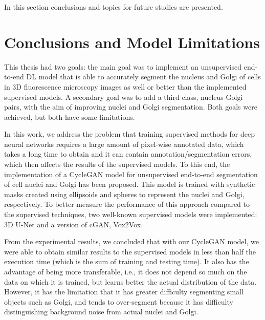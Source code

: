 \cleardoublepage
\label{chap:conclusion}

In this section conclusions and topics for future studies are presented.
\section{Conclusions and Model Limitations}

This thesis had two goals: the main goal was to implement an unsupervised end-to-end \ac{DL} model that is able to accurately segment the nucleus and Golgi of cells in \ac{3D} fluorescence microscopy images as well or better than the implemented supervised models. A secondary goal was to add a third class, nucleus-Golgi pairs, with the aim of improving nuclei and Golgi segmentation. Both goals were achieved, but both have some limitations.

In this work, we address the problem that training supervised methods for deep neural networks requires a large amount of pixel-wise annotated data, which takes a long time to obtain and it can contain annotation/segmentation errors, which then affects the results of the supervised models. To this end, the implementation of a CycleGAN model for unsupervised end-to-end segmentation of cell nuclei and Golgi has been proposed. This model is trained with synthetic masks created using ellipsoids and spheres to represent the nuclei and Golgi, respectively. To better measure the performance of this approach compared to the supervised techniques, two well-known supervised models were implemented: \ac{3D} U-Net and a version of \ac{cGAN}, Vox2Vox. 

From the experimental results, we concluded that with our CycleGAN model, we were able to obtain similar results to the supervised models in less than half the execution time (which is the sum of training and testing time). It also has the advantage of being more transferable, i.e., it does not depend so much on the data on which it is trained, but learns better the actual distribution of the data. However, it has the limitation that it has greater difficulty segmenting small objects such as Golgi, and tends to over-segment because it has difficulty distinguishing background noise from actual nuclei and Golgi.

